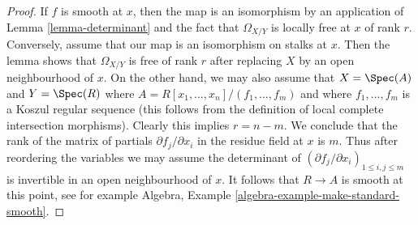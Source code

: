 \begin{proof}
\medskip\noindent
If $f$ is smooth at $x$, then the map is an isomorphism by an application of
Lemma \ref{lemma-determinant}
and the fact that $\Omega_{X/Y}$ is locally free at $x$
of rank $r$. Conversely, assume that our map is an isomorphism on stalks
at $x$. Then the lemma shows that $\Omega_{X/Y}$ is free of rank $r$
after replacing $X$ by an open neighbourhood of $x$.
On the other hand, we may also assume that $X = \Spec(A)$ and
$Y = \Spec(R)$ where $A = R[x_1, \ldots, x_n]/(f_1, \ldots, f_m)$
and where $f_1, \ldots, f_m$ is a Koszul regular sequence
(this follows from the definition of local complete intersection morphisms).
Clearly this implies $r = n - m$. We conclude that the rank of the matrix
of partials $\partial f_j/\partial x_i$ in the residue field at $x$ is $m$.
Thus after reordering the variables we may assume
the determinant of $(\partial f_j/\partial x_i)_{1 \leq i, j \leq m}$
is invertible in an open neighbourhood of $x$. It follows
that $R \to A$ is smooth at this point, see for example
Algebra, Example \ref{algebra-example-make-standard-smooth}.
\end{proof}